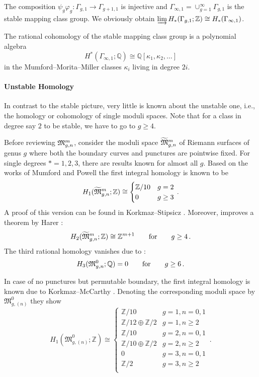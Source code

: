 The composition $\psi_g \varphi_g \colon \Gamma_{g,1} \to \Gamma_{g+1,1}$ is injective and $\Gamma_{\infty,1} = \cup_{g=1}^\infty \Gamma_{g,1}$ is the stable mapping class group.
We obviously obtain $\varinjlim H_\ast( \Gamma_{g,1}; \mathbb Z ) \cong H_\ast(\Gamma_{\infty,1})$.
\begin{thm*}
    The rational cohomology of the stable mapping class group is a polynomial algebra
    \[
        H^\ast( \Gamma_{\infty,1}; \mathbb Q ) \cong \mathbb Q[ \kappa_1, \kappa_2, \ldots ]
    \]
    in the Mumford--Morita--Miller classes $\kappa_i$ living in degree $2i$.
\end{thm*}

\paragraph{Unstable Homology}
In contrast to the stable picture, very little is known about the unstable one, i.e., the homology or cohomology of single moduli spaces.
Note that for a class in degree say $2$ to be stable, we have to go to $g \ge 4$.

Before reviewing $\Modspc$, consider the moduli space $\tildeModspc$ of Riemann surfaces of genus $g$ where both the boundary curves and punctures are pointwise fixed.
For single degrees $\ast = 1,2,3$, there are results known for almost all $g$.
Based on the works of Mumford \cite{Mumford1967} and Powell \cite{Powell1978} the first integral homology is known to be
\[
    H_1(\tildeModspc; \mathbb Z) \cong
        \begin{cases}
            \mathbb Z / 10      & g=2 \\
            0                   & g\ge3
        \end{cases} \,.
\]
A proof of this version can be found in Korkmaz--Stipsicz \cite{KorkmazStipsicz2003}.
Moreover, \cite{KorkmazStipsicz2003} improves a theorem by Harer \cite[Theorem 0.a]{Harer1991}:
\[
    H_2(\tildeModspc; \mathbb Z) \cong \mathbb Z^{m+1} \mspc{for}{20} g \ge 4 \,.
\]
The third rational homology vanishes due to \cite[Theorem 0.b]{Harer1991}:
\[
    H_3(\mathfrak{M}_{g,n}^0; \mathbb Q) = 0 \mspc{for}{20} g \ge 6 \,.
\]

In case of no punctures but permutable boundary, the first integral homology is known due to Korkmaz--McCarthy \cite[Theorem 3.13]{KorkmazMcCarthy2000}.
Denoting the corresponding moduli space by $\mathfrak M_{g,(n)}^0$ they show
\[
    H_1( \mathfrak M_{g,(n)}^0; \mathbb Z) \cong
    \begin{cases}
        \mathbb Z / 10                          & g=1, n=0,1 \\
        \mathbb Z / 12 \oplus \mathbb Z/ 2      & g=1, n\ge2 \\
        \mathbb Z / 10                          & g=2, n=0,1 \\
        \mathbb Z / 10 \oplus \mathbb Z/ 2      & g=2, n\ge2 \\
        0                                       & g=3, n=0,1 \\
        \mathbb Z / 2                           & g=3, n\ge2 \\
    \end{cases} \,.
\]

